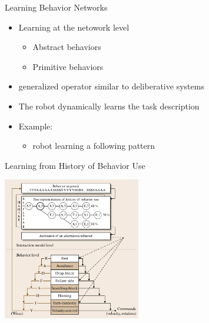\documentclass{beamer}
\begin{document}
\begin{frame}{Learning Behavior Networks}
  \begin{itemize}
    \item Learning at the netowork level
    \begin{itemize}
      \item Abstract behaviors
      \item Primitive behaviors
    \end{itemize}
    \item generalized operator similar to deliberative systems
    \item The robot dynamically learns the task description
    \item Example:
    \begin{itemize}
      \item robot learning a following pattern
    \end{itemize}
  \end{itemize}
\end{frame}

\begin{frame}{Learning from History of Behavior Use}
  \begin{center}
    \includegraphics[width=6cm]{history.png}
  \end{center}
\end{frame}
\end{document}

